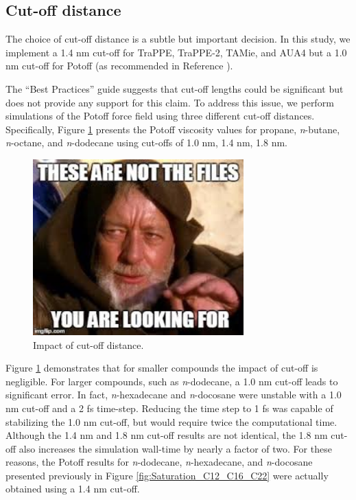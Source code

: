 \documentclass[preprint,review,12pt]{elsarticle}
\begin{document}
	
	\subsection{Cut-off distance}
	
	The choice of cut-off distance is a subtle but important decision. In this study, we implement a 1.4 nm cut-off for TraPPE, TraPPE-2, TAMie, and AUA4 but a 1.0 nm cut-off for Potoff (as recommended in Reference ).
	
	
	The ``Best Practices'' guide suggests that cut-off lengths could be significant but does not provide any support for this claim. To address this issue, we perform simulations of the Potoff force field using three different cut-off distances. Specifically, Figure \ref{fig:cutoff_distance} presents the Potoff viscosity values for propane, \textit{n}-butane, \textit{n}-octane, and \textit{n}-dodecane using cut-offs of 1.0 nm, 1.4 nm, 1.8 nm. 
	
	
	\begin{figure}[htb!]
		\centering
		\includegraphics[width=3.2in]{empty_figure.jpg}
		\caption{Impact of cut-off distance.}
		\label{fig:cutoff_distance}
	\end{figure} 
	
	Figure \ref{fig:cutoff_distance} demonstrates that for smaller compounds the impact of cut-off is negligible. For larger compounds, such as \textit{n}-dodecane, a 1.0 nm cut-off leads to significant error. In fact, \textit{n}-hexadecane and \textit{n}-docosane were unstable with a 1.0 nm cut-off and a 2 fs time-step. Reducing the time step to 1 fs was capable of stabilizing the 1.0 nm cut-off, but would require twice the computational time. Although the 1.4 nm and 1.8 nm cut-off results are not identical, the 1.8 nm cut-off also increases the simulation wall-time by nearly a factor of two. For these reasons, the Potoff results for \textit{n}-dodecane, \textit{n}-hexadecane, and \textit{n}-docosane presented previously in Figure \ref{fig:Saturation_C12_C16_C22} were actually obtained using a 1.4 nm cut-off.
	
\end{document}
